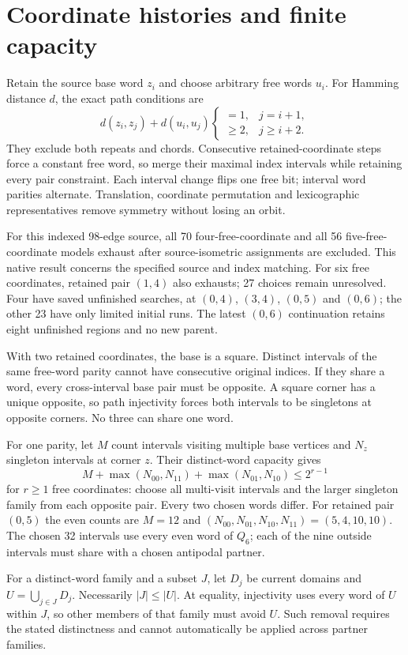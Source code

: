 \documentclass[11pt,a4paper]{article}
\begin{document}
\section{Coordinate histories and finite capacity}
Retain the source base word $z_i$ and choose arbitrary free words $u_i$.
For Hamming distance $d$, the exact path conditions are
\[
d(z_i,z_j)+d(u_i,u_j)
\begin{cases}=1,&j=i+1,\\ \ge2,&j\ge i+2.\end{cases}
\]
They exclude both repeats and chords. Consecutive retained-coordinate steps
force a constant free word, so merge their maximal index intervals while
retaining every pair constraint. Each interval change flips one free bit;
interval word parities alternate. Translation, coordinate permutation and
lexicographic representatives remove symmetry without losing an orbit.

For this indexed 98-edge source, all 70 four-free-coordinate and all 56
five-free-coordinate models exhaust after source-isometric assignments are
excluded. This native result concerns the specified source and index matching.
For six free coordinates, retained pair $(1,4)$ also exhausts; 27 choices
remain unresolved. Four have saved unfinished searches, at $(0,4)$,
$(3,4)$, $(0,5)$ and $(0,6)$; the other 23 have only limited initial runs.
The latest $(0,6)$ continuation retains eight unfinished regions and no new parent.

With two retained coordinates, the base is a square. Distinct intervals of
the same free-word parity cannot have consecutive original indices.
If they share a word, every cross-interval base pair must be opposite.
A square corner has a unique opposite, so path injectivity forces both
intervals to be singletons at opposite corners. No three can share one word.

For one parity, let $M$ count intervals visiting multiple base vertices and
$N_z$ singleton intervals at corner $z$. Their distinct-word capacity gives
\[
\boxed{M+\max(N_{00},N_{11})+\max(N_{01},N_{10})\le2^{r-1}}
\]
for $r\ge1$ free coordinates: choose all multi-visit intervals and the larger
singleton family from each opposite pair. Every two chosen words differ.
For retained pair $(0,5)$ the even counts are $M=12$ and
$(N_{00},N_{01},N_{10},N_{11})=(5,4,10,10)$.
The chosen 32 intervals use every even word of $Q_6$; each of the nine
outside intervals must share with a chosen antipodal partner.

For a distinct-word family and a subset $J$, let $D_j$ be current domains
and $U=\bigcup_{j\in J}D_j$. Necessarily $|J|\le|U|$.
At equality, injectivity uses every word of $U$ within $J$, so other
members of that family must avoid $U$. Such removal requires the stated
distinctness and cannot automatically be applied across partner families.
\end{document}
